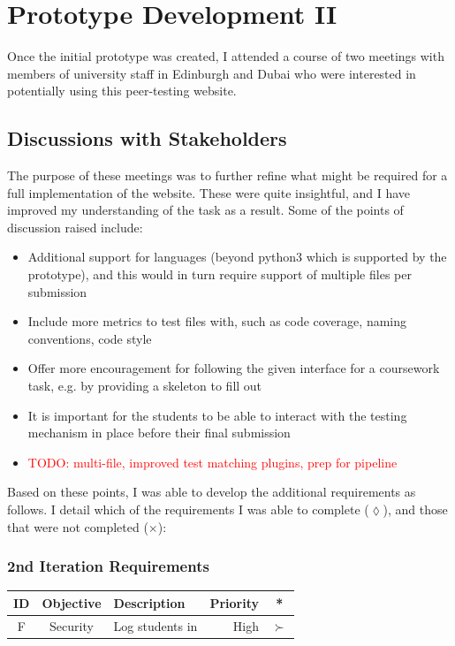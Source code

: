 \documentclass[a4paper,11pt]{report}
\newcommand{\todo}[1]{\textcolor{red}{TODO: #1}}
\newcounter{FunCount}
\newcommand{\freq}[4]{\addtocounter{FunCount}{1}F\arabic{FunCount} & #1 & #2 & #3 & #4\\}
\begin{document}
\chapter{Prototype Development II}
\label{ch:proto2}
Once the initial prototype was created, I attended a course of two meetings with members of university staff in Edinburgh and Dubai who were interested in potentially using this peer-testing website.\par

\section{Discussions with Stakeholders}
The purpose of these meetings was to further refine what might be required for a full implementation of the website. These were quite insightful, and I have improved my understanding of the task as a result. Some of the points of discussion raised include:
\begin{itemize}
\item Additional support for languages (beyond python3 which is supported by the prototype), and this would in turn require support of multiple files per submission
\item Include more metrics to test files with, such as code coverage, naming conventions, code style
\item Offer more encouragement for following the given interface for a coursework task, e.g. by providing a skeleton to fill out
\item It is important for the students to be able to interact with the testing mechanism in place before their final submission
\item \todo{multi-file, improved test matching plugins, prep for pipeline}
\end{itemize}
Based on these points, I was able to develop the additional requirements as follows. I detail which of the requirements I was able to complete ($\lozenge$), and those that were not completed ($\times$):
\subsection{2nd Iteration Requirements}
\begin{longtable}{cclrc}
\textbf{ID} & \textbf{Objective} & \textbf{Description} & \textbf{Priority} & \textbf{*}\\\hline
\freq{Security}{Log students in}{High}{$\succ$}
\end{longtable}
\end{document}
